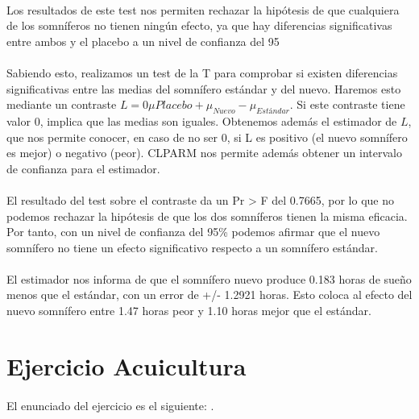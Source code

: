 \documentclass{article}
\begin{document}
    \paragraph{}
    Los resultados de este test nos permiten rechazar la hipótesis de que cualquiera de los somníferos no tienen ningún efecto, ya que hay diferencias significativas entre ambos y el placebo a un nivel de confianza del 95%

    \paragraph{}
    Sabiendo esto, realizamos un test de la T para comprobar si existen diferencias significativas entre las medias del somnífero estándar y del nuevo. Haremos esto mediante un contraste $L=0\mu{Placebo} + \mu_{Nuevo} - \mu_{Estándar}$. Si este contraste tiene valor 0, implica que las medias son iguales. Obtenemos además el estimador de $L$, que nos permite conocer, en caso de no ser 0, si L es positivo (el nuevo somnífero es mejor) o negativo (peor). CLPARM nos permite además obtener un intervalo de confianza para el estimador.

    \paragraph{}
    El resultado del test sobre el contraste da un Pr > F del 0.7665, por lo que no podemos rechazar la hipótesis de que los dos somníferos tienen la misma eficacia. Por tanto, con un nivel de confianza del 95\% podemos afirmar que el nuevo somnífero no tiene un efecto significativo respecto a un somnífero estándar.

    \paragraph{}
    El estimador nos informa de que el somnífero nuevo produce 0.183 horas de sueño menos que el estándar, con un error de +/- 1.2921 horas. Esto coloca al efecto del nuevo somnífero entre 1.47 horas peor y 1.10 horas mejor que el estándar.

  \section{Ejercicio Acuicultura}

    \paragraph{}
    El enunciado del ejercicio es el siguiente: .
\end{document}
